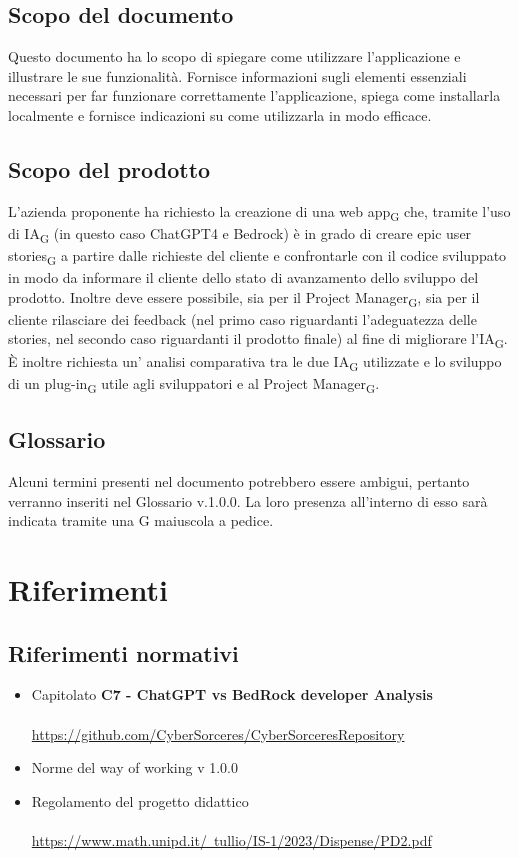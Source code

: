 \documentclass{article}
\begin{document}
{\subsection{Scopo del documento}
Questo documento ha lo scopo di spiegare come utilizzare l'applicazione e illustrare le sue funzionalità. Fornisce informazioni sugli elementi essenziali necessari per far funzionare correttamente l'applicazione, spiega come installarla localmente e fornisce indicazioni su come utilizzarla in modo efficace.
\subsection{Scopo del prodotto}
L'azienda proponente ha richiesto la creazione di una web app\textsubscript{G} che, tramite l'uso di IA\textsubscript{G} (in questo caso ChatGPT4 e Bedrock) è in grado di creare epic user stories\textsubscript{G} a partire dalle richieste del cliente e confrontarle con il codice sviluppato in modo da informare il cliente dello stato di avanzamento dello sviluppo del prodotto. Inoltre deve essere possibile, sia per il Project Manager\textsubscript{G}, sia per il cliente rilasciare dei feedback (nel primo caso riguardanti l'adeguatezza delle stories, nel secondo caso riguardanti il prodotto finale) al fine di migliorare l'IA\textsubscript{G}. È inoltre richiesta un' analisi comparativa tra le due IA\textsubscript{G} utilizzate e lo sviluppo di un plug-in\textsubscript{G} utile agli sviluppatori e al Project Manager\textsubscript{G}.

\subsection{Glossario}
Alcuni termini presenti nel documento potrebbero essere ambigui, pertanto verranno inseriti nel Glossario v.1.0.0. La loro presenza all'interno di esso sarà indicata tramite una G maiuscola a pedice.

\section{Riferimenti}
\subsection{Riferimenti normativi}
\begin{itemize}
    \item Capitolato \textbf{C7 - ChatGPT vs BedRock developer Analysis}
    \\ \\
       \href{https://github.com/CyberSorceres/CyberSorceresRepository}{https://github.com/CyberSorceres/CyberSorceresRepository} 
    \item Norme del way of working v 1.0.0
    \item Regolamento del progetto didattico \\ \\ \href{https://www.math.unipd.it/~tullio/IS-1/2023/Dispense/PD2.pdf} 
    {https://www.math.unipd.it/~tullio/IS-1/2023/Dispense/PD2.pdf}
\end{itemize}
}
\end{document}
